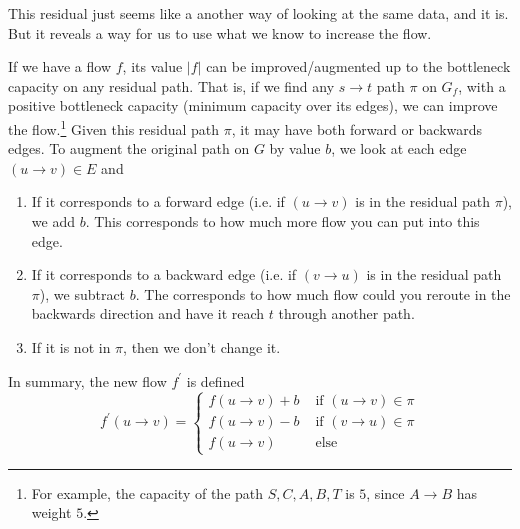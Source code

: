   This residual just seems like a another way of looking at the same data, and it is. But it reveals a way for us to use what we know to increase the flow.  

  \begin{theorem}
    \label{thm:augmenting-paths-on-residual-networks-improves}
    If we have a flow $f$, its value $|f|$ can be improved/augmented up to the bottleneck capacity on any residual path. That is, if we find any $s \rightarrow t$ path $\pi$ on $G_f$, with a positive bottleneck capacity (minimum capacity over its edges), we can improve the flow.\footnote{For example, the capacity of the path $S, C, A, B, T$ is $5$, since $A \rightarrow B$ has weight $5$.} Given this residual path $\pi$, it may have both forward or backwards edges. To augment the original path on $G$ by value $b$, we look at each edge $(u \rightarrow v) \in E$ and 
    \begin{enumerate}
      \item If it corresponds to a forward edge (i.e. if $(u \rightarrow v)$ is in the residual path $\pi$), we add $b$. This corresponds to how much more flow you can put into this edge. 
      \item If it corresponds to a backward edge (i.e. if $(v \rightarrow u)$ is in the residual path $\pi$), we subtract $b$. The corresponds to how much flow could you reroute in the backwards direction and have it reach $t$ through another path.   
      \item If it is not in $\pi$, then we don't change it. 
    \end{enumerate}
    In summary, the new flow $f^\prime$ is defined 
    \begin{equation}
      f^\prime (u \rightarrow v) = \begin{cases} 
        f(u \rightarrow v) + b & \text{ if } (u \rightarrow v) \in \pi \\ 
        f(u \rightarrow v) - b & \text{ if } (v \rightarrow u) \in \pi \\  
        f(u \rightarrow v) & \text{ else }
      \end{cases}
    \end{equation}
  \end{theorem} 
